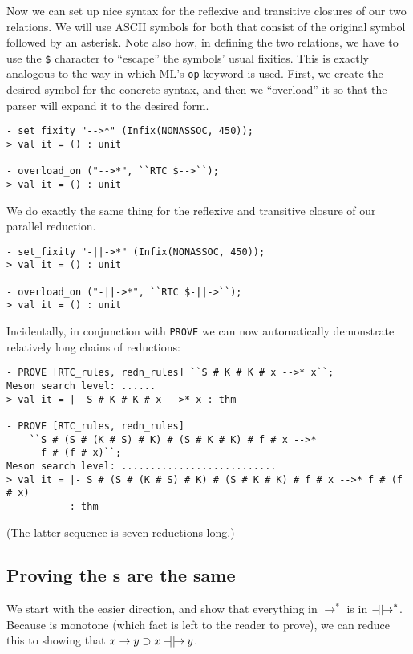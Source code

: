 Now we can set up nice syntax for the reflexive and transitive
closures of our two relations.  We will use ASCII symbols for both
that consist of the original symbol followed by an asterisk.  Note
also how, in defining the two relations, we have to use the
\texttt{\$} character to ``escape'' the symbols' usual fixities.  This
is exactly analogous to the way in which ML's \texttt{op} keyword is
used.  First, we create the desired symbol for the concrete syntax,
and then we ``overload'' it so that the parser will expand it to the
desired form.
\begin{session}
\begin{verbatim}
- set_fixity "-->*" (Infix(NONASSOC, 450));
> val it = () : unit

- overload_on ("-->*", ``RTC $-->``);
> val it = () : unit
\end{verbatim}
\end{session}
We do exactly the same thing for the reflexive and transitive closure
of our parallel reduction.
\begin{session}
\begin{verbatim}
- set_fixity "-||->*" (Infix(NONASSOC, 450));
> val it = () : unit

- overload_on ("-||->*", ``RTC $-||->``);
> val it = () : unit
\end{verbatim}
\end{session}
Incidentally, in conjunction with \texttt{PROVE} we can now
automatically demonstrate relatively long chains of reductions:
\begin{session}
\begin{verbatim}
- PROVE [RTC_rules, redn_rules] ``S # K # K # x -->* x``;
Meson search level: ......
> val it = |- S # K # K # x -->* x : thm

- PROVE [RTC_rules, redn_rules]
    ``S # (S # (K # S) # K) # (S # K # K) # f # x -->*
      f # (f # x)``;
Meson search level: ...........................
> val it = |- S # (S # (K # S) # K) # (S # K # K) # f # x -->* f # (f # x)
           : thm
\end{verbatim}
\end{session}
(The latter sequence is seven reductions long.)


\subsection{Proving the s are the same}
\label{sec:Proving-RTCs-same}

We start with the easier direction, and show that everything in
$\rightarrow^*$ is in $\mathbin{-\!\!\!\mid\mid\!\rightarrow}^*$.  Because
 is monotone (which fact is left to the reader to prove),
we can reduce this to showing that $x\rightarrow y\supset x\mathbin{-\!\!\!\mid\mid\!\rightarrow} y$.

